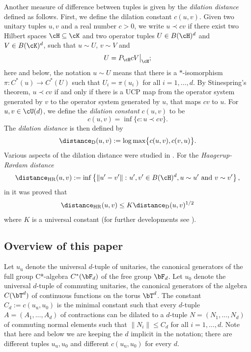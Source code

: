 Another measure of difference between tuples is given by the {\em dilation distance} \cite{GPSS21} defined as follows. 
First, we define the dilation constant $c(u,v)$. 
Given two unitary tuples $u,v$ and a real number $c>0$, we write $u \prec cv$ if there exist two Hilbert spaces $\cH \subseteq \cK$ and two operator tuples $U \in B(\cH)^d$ and $V \in B(\cK)^d$, such that $u \sim U$, $v \sim V$ and 
\[
U = P_\cH cV \big|_\cH;
\]
here and below, the notation $u \sim U$ means that there is a $*$-isomorphism $\pi\colon C^*(u) \to C^*(U)$ such that $U_i = \pi(u_i)$ for all $i=1, \ldots, d$. 
By Stinespring's theorem, $u \prec cv$ if and only if there is a UCP map from the operator system generated by $v$ to the operator system generated by $u$, that maps $cv$ to $u$. 
For $u,v \in \cU(d)$, we define the \emph{dilation constant} $c(u,v)$ to be  
\[
c(u,v) = \inf\{c :  u \prec cv\}. 
\]
The {\em dilation distance} is then defined by 
\[
\distance_{\mathrm{D}}(u,v):= \log \max\bigl\{c(u,v), c(v,u)\bigr\} .
\]
Various aspects of the dilation distance were studied in \cite{GPSS21}. For the {\em Haagerup-Rørdam distance}
\[
\distance_{\mathrm{HR}}(u,v):=\inf\left\{\left\|u'-v'\right\|\colon u', v' \in B(\cH)^d,  u \sim u' \textrm{ and } v \sim v'\right\}, 
\]
in \cite[Theorem 2.6]{GPSS21} it was proved that 
\[
\distance_{\mathrm{HR}}(u,v) \leq K \distance_{\mathrm{D}}(u,v)^{1/2}
\]
where $K$ is a universal constant (for further developments see \cite{gerhold2023bounded,gerhold2024dilation,GLL26}). 



\subsection{Overview of this paper}\label{sec:overview}

Let $u_{\mathrm u}$ denote the universal $d$-tuple of unitaries, \ie the canonical generators of the full group C*-algebra $C^*(\bF_d)$ of the free group $\bF_d$. 
Let $u_0$ denote the universal $d$-tuple of commuting unitaries, \ie the canonical generators of the algebra $C(\bT^d)$ of continuous functions on the torus $\bT^d$. 
The constant $C_d := c(u_{\mathrm u}, u_0)$ is the minimal constant such that every $d$-tuple $A = (A_1, \ldots, A_d)$ of contractions can be dilated to a $d$-tuple $N = (N_1, \ldots, N_d)$ of commuting normal elements such that $\|N_i\| \leq C_d$ for all $i=1, \ldots, d$.
Note that here and below we are keeping the $d$ implicit in the notation; there are different tuples $u_{\mathrm u}, u_0$  and different $c(u_{\mathrm u}, u_0)$ for every $d$. 

